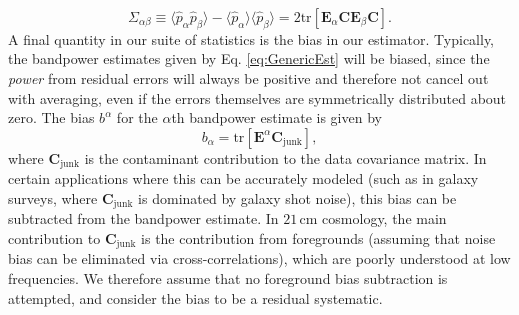 \documentclass[twocolumn,aps,prd,nofootinbib,showpacs]{revtex4-1}
\begin{document}
\begin{equation}
\Sigma_{\alpha \beta} \equiv \langle \widehat{p}_\alpha \widehat{p}_\beta \rangle - \langle \widehat{p}_\alpha \rangle \langle \widehat{p}_\beta \rangle = 2 \textrm{tr} \left[ \mathbf{E}_\alpha \mathbf{C} \mathbf{E}_\beta \mathbf{C} \right].
\end{equation}
A final quantity in our suite of statistics is the bias in our estimator.  Typically, the bandpower estimates given by Eq. \eqref{eq:GenericEst} will be biased, since the \emph{power} from residual errors will always be positive and therefore not cancel out with averaging, even if the errors themselves are symmetrically distributed about zero.  The bias $b^\alpha$ for the $\alpha$th bandpower estimate is given by
\begin{equation}
\label{eq:bias}
b_\alpha = \textrm{tr}  [\mathbf{E}^\alpha \mathbf{C}_\textrm{junk}],
\end{equation}
where $\mathbf{C}_\textrm{junk}$ is the contaminant contribution to the data covariance matrix.  In certain applications where this can be accurately modeled (such as in galaxy surveys, where $\mathbf{C}_\textrm{junk}$ is dominated by galaxy shot noise), this bias can be subtracted from the bandpower estimate.  In $21\,\textrm{cm}$ cosmology, the main contribution to $\mathbf{C}_\textrm{junk}$ is the contribution from foregrounds (assuming that noise bias can be eliminated via cross-correlations), which are poorly understood at low frequencies.  We therefore assume that no foreground bias subtraction is attempted, and consider the bias to be a residual systematic.
\end{document}
